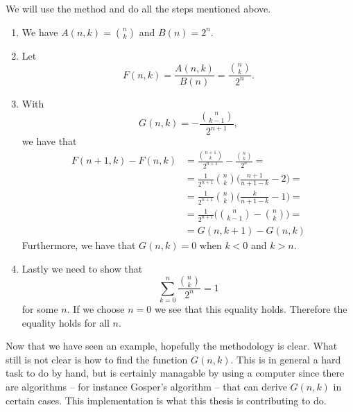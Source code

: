 \begin{solution}
  We will use the method and do all the steps mentioned above.
  \begin{enumerate}
    \item We have $A(n,k)=\binom{n}{k}$ and $B(n)=2^n$.
    \item Let $$F(n,k)=\frac{A(n,k)}{B(n)}=\frac{\binom{n}{k}}{2^n}.$$
    \item With $$G(n,k)=-\frac{\binom{n}{k-1}}{2^{n+1}},$$ we have that
      \begin{equation*}
        \begin{split}
          F(n+1,k)-F(n,k) & = \frac{\binom{n+1}{k}}{2^{n+1}}-\frac{\binom{n}{k}}{2^{n}}= \\
          & = \frac{1}{2^{n+1}}\binom{n}{k}\Bigg(\frac{n+1}{n+1-k}-2\Bigg) = \\
          & = \frac{1}{2^{n+1}}\binom{n}{k}\Bigg(\frac{k}{n+1-k}-1\Bigg) = \\
          & = \frac{1}{2^{n+1}}\Bigg(\binom{n}{k-1}-\binom{n}{k}\Bigg) = \\
          & = G(n,k+1)-G(n,k)
        \end{split}
      \end{equation*}
      Furthermore, we have that $G(n,k) = 0$ when $k<0$ and $k>n$.
    \item Lastly we need to show that $$\sum_{k=0}^n \frac{\binom{n}{k}}{2^n}=1$$ for some $n$. If we choose $n=0$ we see that this equality holds. Therefore the equality holds for all $n$.
  \end{enumerate}
\end{solution}
Now that we have seen an example, hopefully the methodology is clear. What still is not clear is how to find the function $G(n,k)$. This is in general a hard task to do by hand, but is certainly managable by using a computer since there are algorithms -- for instance Gosper's algorithm -- that can derive $G(n,k)$ in certain cases. This implementation is what this thesis is contributing to do. %

